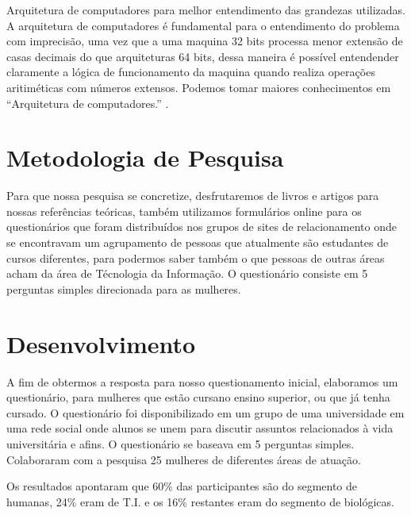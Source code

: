 \documentclass[
	12pt,				%
	oneside,			%
	a4paper,			%
	english,			%
	french,				%
	spanish,			%
	brazil,				%
	]{abntex2}
\begin{document}
 Arquitetura de computadores para melhor entendimento das grandezas utilizadas.
A arquitetura de computadores é fundamental para o entendimento do problema com imprecisão, uma vez que a uma maquina 32 bits processa menor extensão de casas decimais do que arquiteturas 64 bits, dessa maneira é possível entendender claramente a lógica de funcionamento da maquina quando realiza operações aritiméticas com números extensos. Podemos tomar maiores conhecimentos em “Arquitetura de computadores.” \cite{juniorarquitetura} .
\chapter{Metodologia de Pesquisa}
Para que nossa pesquisa se concretize, desfrutaremos de livros e artigos para nossas referências teóricas, também utilizamos formulários online para os questionários que foram distribuídos nos grupos de sites de relacionamento onde se encontravam um agrupamento de pessoas que atualmente s\~{a}o estudantes de cursos diferentes, para podermos saber também o que pessoas de outras áreas acham da área de Técnologia da Informaç\~{a}o.
O questionário consiste em 5 perguntas simples direcionada para as mulheres.

\chapter{Desenvolvimento}

A fim de obtermos a resposta para nosso questionamento inicial, elaboramos um questionário, para mulheres que est\~{a}o cursano ensino superior, ou que já tenha cursado. O questionário foi disponibilizado em um grupo de uma universidade em uma rede social onde alunos se unem para discutir assuntos relacionados à vida universitária e afins. O questionário se baseava em 5 perguntas simples. Colaboraram com a pesquisa 25 mulheres de diferentes áreas de atuaç\~{a}o.

Os resultados apontaram que 60\% das participantes s\~{a}o do segmento de humanas, 24\% eram de T.I. e os 16\% restantes eram do segmento de biológicas.
 	



\end{document}
